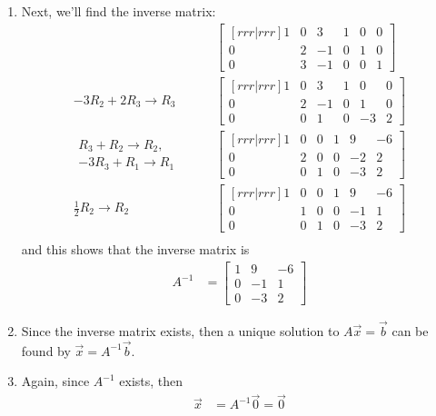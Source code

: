 \begin{example}
\begin{enumerate}
\item Next, we'll find the inverse matrix:
%
\begin{align*}
\qquad & \begin{bmatrix}[rrr|rrr]
1 & 0 & 3 & 1 & 0 & 0\\
0 & 2 & -1 & 0 & 1 &0 \\
0 & 3 & -1 & 0 & 0 & 1
\end{bmatrix} \\
-3 R_2 +2 R_3 \rightarrow R_3 \qquad &
\begin{bmatrix}[rrr|rrr]
1 & 0 & 3 & 1 & 0 & 0\\
0 & 2 & -1 & 0 & 1 &0 \\
0 & 0 & 1 & 0 & -3 & 2
\end{bmatrix} \\
\begin{array}{r}
R_3 + R_2 \rightarrow R_2, \\
-3R_3 + R_1 \rightarrow R_1
\end{array} \qquad &
\begin{bmatrix}[rrr|rrr]
1 & 0 & 0 & 1 & 9 & -6\\
0 & 2 & 0 & 0 & -2 &2 \\
0 & 0 & 1 & 0 & -3 & 2
\end{bmatrix} \\
\frac{1}{2} R_2 \rightarrow R_2 \qquad &
\begin{bmatrix}[rrr|rrr]
1 & 0 & 0 & 1 & 9 & -6\\
0 & 1 & 0 & 0 & -1 & 1 \\
0 & 0 & 1 & 0 & -3 & 2
\end{bmatrix} \\
\end{align*}
and this shows that the inverse matrix is
%
\begin{align*}
A^{-1} &= \begin{bmatrix}
1 & 9 & -6\\
0 & -1 & 1 \\
0 & -3 & 2
\end{bmatrix}
\end{align*}

\item Since the inverse matrix exists, then a unique solution to $A\vec{x}=\vec{b}$ can be found by $\vec{x}=A^{-1}\vec{b}$.

\item Again, since $A^{-1}$ exists, then
%
\begin{align*}
\vec{x} & = A^{-1}\vec{0} = \vec{0}
\end{align*}


\end{enumerate}
\end{example}
